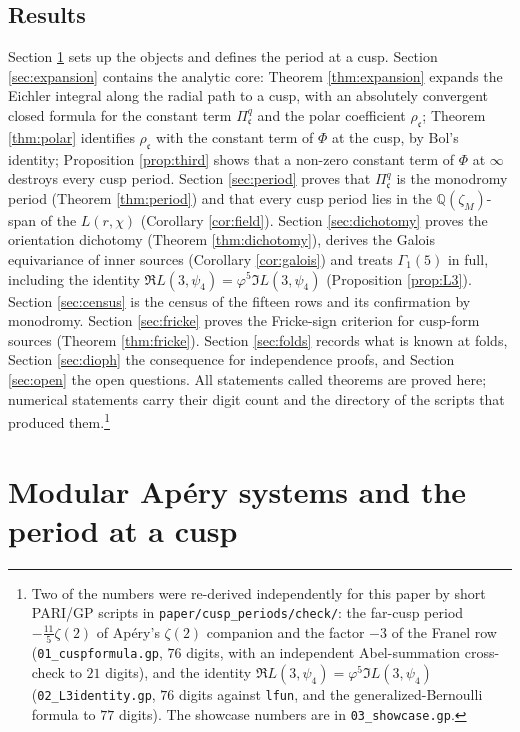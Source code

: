 \documentclass[11pt]{amsart}
\theoremstyle{definition}
\theoremstyle{remark}
\newcommand{\Q}{\mathbb Q}\newcommand{\Z}{\mathbb Z}\newcommand{\R}{\mathbb R}\newcommand{\C}{\mathbb C}\newcommand{\HH}{\mathbb H}
\newcommand{\cc}{\mathfrak c}\newcommand{\Pc}{\Pi_{\cc}}\newcommand{\Pq}{\Pi^{q}}
\begin{document}
\subsection*{Results} Section \ref{sec:setting} sets up the objects and defines the period at a cusp. Section \ref{sec:expansion} contains the analytic core: Theorem \ref{thm:expansion} expands the Eichler integral along the radial path to a cusp, with an absolutely convergent closed formula for the constant term $\Pq_{\cc}$ and the polar coefficient $\rho_{\cc}$; Theorem \ref{thm:polar} identifies $\rho_{\cc}$ with the constant term of $\Phi$ at the cusp, by Bol's identity; Proposition \ref{prop:third} shows that a non-zero constant term of $\Phi$ at $\infty$ destroys every cusp period. Section \ref{sec:period} proves that $\Pq_{\cc}$ is the monodromy period (Theorem \ref{thm:period}) and that every cusp period lies in the $\Q(\zeta_M)$-span of the $L(r,\chi)$ (Corollary \ref{cor:field}). Section \ref{sec:dichotomy} proves the orientation dichotomy (Theorem \ref{thm:dichotomy}), derives the Galois equivariance of inner sources (Corollary \ref{cor:galois}) and treats $\Gamma_1(5)$ in full, including the identity $\Re L(3,\psi_4)=\varphi^5\Im L(3,\psi_4)$ (Proposition \ref{prop:L3}). Section \ref{sec:census} is the census of the fifteen rows and its confirmation by monodromy. Section \ref{sec:fricke} proves the Fricke-sign criterion for cusp-form sources (Theorem \ref{thm:fricke}). Section \ref{sec:folds} records what is known at folds, Section \ref{sec:dioph} the consequence for independence proofs, and Section \ref{sec:open} the open questions. All statements called theorems are proved here; numerical statements carry their digit count and the directory of the scripts that produced them.\footnote{Two of the numbers were re-derived independently for this paper by short PARI/GP scripts in \texttt{paper/cusp\_periods/check/}: the far-cusp period $-\tfrac{11}5\zeta(2)$ of Ap\'ery's $\zeta(2)$ companion and the factor $-3$ of the Franel row (\texttt{01\_cuspformula.gp}, $76$ digits, with an independent Abel-summation cross-check to $21$ digits), and the identity $\Re L(3,\psi_4)=\varphi^5\Im L(3,\psi_4)$ (\texttt{02\_L3identity.gp}, $76$ digits against \texttt{lfun}, and the generalized-Bernoulli formula to $77$ digits). The showcase numbers are in \texttt{03\_showcase.gp}.}

\section{Modular Ap\'ery systems and the period at a cusp}\label{sec:setting}
\end{document}
